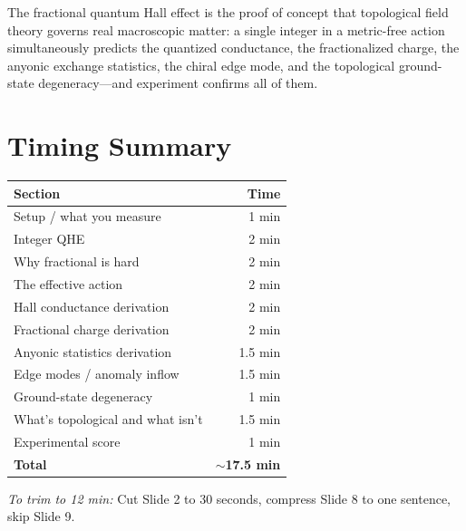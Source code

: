 \documentclass[11pt]{article}
\begin{document}
The fractional quantum Hall effect is the proof of concept that topological field theory governs real macroscopic matter: a single integer in a metric-free action simultaneously predicts the quantized conductance, the fractionalized charge, the anyonic exchange statistics, the chiral edge mode, and the topological ground-state degeneracy---and experiment confirms all of them.

\vfill

\section*{Timing Summary}

\begin{center}
\begin{tabular}{lr}
\toprule
Section & Time \\
\midrule
Setup / what you measure & 1 min \\
Integer QHE & 2 min \\
Why fractional is hard & 2 min \\
The effective action & 2 min \\
Hall conductance derivation & 2 min \\
Fractional charge derivation & 2 min \\
Anyonic statistics derivation & 1.5 min \\
Edge modes / anomaly inflow & 1.5 min \\
Ground-state degeneracy & 1 min \\
What's topological and what isn't & 1.5 min \\
Experimental score & 1 min \\
\midrule
\textbf{Total} & \textbf{$\sim$17.5 min} \\
\bottomrule
\end{tabular}
\end{center}

\noindent\textit{To trim to 12 min:} Cut Slide 2 to 30 seconds, compress Slide 8 to one sentence, skip Slide 9.
\end{document}
